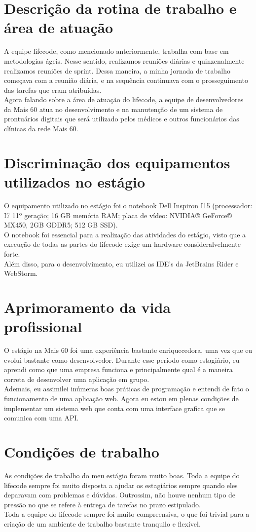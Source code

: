 \documentclass[12pt]{article}
\begin{document}
\section{Descrição da rotina de trabalho e área de atuação}
A equipe lifecode, como mencionado anteriormente, trabalha com base em metodologias ágeis. Nesse sentido, realizamos reuniões diárias e quinzenalmente realizamos reuniões de sprint. Dessa maneira, a minha jornada de trabalho começava com a reunião diária, e na sequência continuava com o prosseguimento das tarefas que eram atribuídas.
\\
Agora falando sobre a área de atuação do lifecode, a equipe de desenvolvedores da Mais 60 atua no desenvolvimento e na manutenção de um sistema de prontuários digitais que será utilizado pelos médicos e outros funcionários das clínicas da rede Mais 60.

\section{Discriminação dos equipamentos utilizados no estágio}
O equipamento utilizado no estágio foi o notebook Dell Inspiron I15 (processador: I7 11º geração; 16 GB memória RAM; placa de vídeo: NVIDIA® GeForce® MX450, 2GB GDDR5; 512 GB SSD).
\\
O notebook foi essencial para a realização das atividades do estágio, visto que a execução de todas as partes do lifecode exige um hardware consideralvelmente forte.
\\
Além disso, para o desenvolvimento, eu utilizei as IDE's da JetBrains Rider e WebStorm. 

\section{Aprimoramento da vida profissional}
O estágio na Mais 60 foi uma experiência bastante enriquecedora, uma vez que eu evolui bastante como desenvolvedor. Durante esse período como estagiário, eu aprendi como que uma empresa funciona e principalmente qual é a maneira correta de desenvolver uma aplicação em grupo.
\\
Ademais, eu assimilei inúmeras boas práticas de programação e entendi de fato o funcionamento de uma aplicação web. Agora eu estou em plenas condições de implementar um sistema web que conta com uma interface grafica que se comunica com uma API. 

\section{Condições de trabalho}
As condições de trabalho do meu estágio foram muito boas. Toda a equipe do lifecode sempre foi muito disposta a ajudar os estagiários sempre quando eles deparavam com problemas e dúvidas. Outrossim, não houve nenhum tipo de pressão no que se refere à entrega de tarefas no prazo estipulado.
\\ 
Toda a equipe do lifecode sempre foi muito compreensiva, o que foi trivial para a criação de um ambiente de trabalho bastante tranquilo e flexível.
\end{document}
